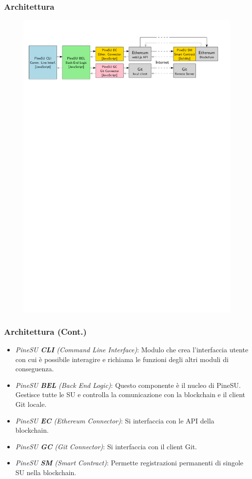 \documentclass{beamer}
\begin{document}
\begin{frame}
	\frametitle{Architettura}
	\centering
	\begin{figure}
		\includegraphics[width=\textwidth]{figures/pineSU-architecture.pdf}
	\end{figure}
\end{frame}

\begin{frame}
	\frametitle{Architettura (Cont.)}
	\begin{itemize}
		\item \emph{PineSU \textbf{CLI} (Command Line Interface)}: Modulo che crea l'interfaccia utente con cui è possibile
			interagire e richiama le funzioni degli altri moduli di conseguenza.
		\item \emph{PineSU \textbf{BEL} (Back End Logic)}: Questo componente è il nucleo di PineSU.
		Gestisce tutte le SU e controlla la comunicazione con la blockchain e il client Git locale.
		\item \emph{PineSU \textbf{EC} (Ethereum Connector)}: Si interfaccia con le API della blockchain. 
		\item \emph{PineSU \textbf{GC} (Git Connector)}: Si interfaccia con il client Git. 
		\item \emph{PineSU \textbf{SM} (Smart Contract)}: Permette registrazioni permanenti di singole SU nella blockchain.
	\end{itemize}
\end{frame}
\end{document}
